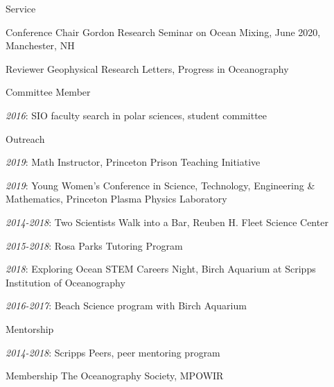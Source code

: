 \documentclass{resume} %
\begin{document}
\begin{rSection}{Service}
\begin{rSubsection}{Conference Chair}
Gordon Research Seminar on Ocean Mixing, June 2020, Manchester, NH
\end{rSubsection}
\begin{rSubsection}{Reviewer}
Geophysical Research Letters, Progress in Oceanography
\end{rSubsection}
\begin{rSubsection}{Committee Member}
\item {\em 2016}: SIO faculty search in polar sciences, student committee
\end{rSubsection}
\begin{rSubsection}{Outreach}
\item {\em 2019}: Math Instructor, Princeton Prison Teaching Initiative
\item {\em 2019}: Young Women's Conference in Science, Technology, Engineering \& Mathematics, Princeton Plasma Physics Laboratory
\item {\em 2014-2018}: Two Scientists Walk into a Bar, Reuben H. Fleet Science Center
\item {\em 2015-2018}: Rosa Parks Tutoring Program
\item {\em 2018}: Exploring Ocean STEM Careers Night, Birch Aquarium at Scripps Institution of Oceanography
\item {\em 2016-2017}: Beach Science program with Birch Aquarium
\end{rSubsection}
\begin{rSubsection}{Mentorship}
\item {\em 2014-2018}: Scripps Peers, peer mentoring program
\end{rSubsection}
\begin{rSubsection}{Membership}
The Oceanography Society, MPOWIR
\end{rSubsection}
\end{rSection}
\end{document}
